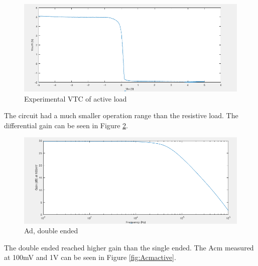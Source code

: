 \begin{figure}[H]
    \begin{center}
    \includegraphics[scale=.45]{ExperimentalImplementation/Active_VTC.png}
    \caption{Experimental VTC of active load}
    \label{fig:activeVTC}
    \end{center}
\end{figure}

The circuit had a much smaller operation range than the resistive load. The differential gain can be seen in Figure \ref{fig:activeAd}.


\begin{figure}[H]
        \center
        \includegraphics[width=.85\textwidth]{ExperimentalImplementation/Adb_active.png}
        \caption{Ad, double ended}
        \label{fig:activeAd}
 
\end{figure}

The double ended reached higher gain than the single ended. The Acm measured at 100mV  and 1V can be seen in Figure \ref{fig:Acmactive}.



